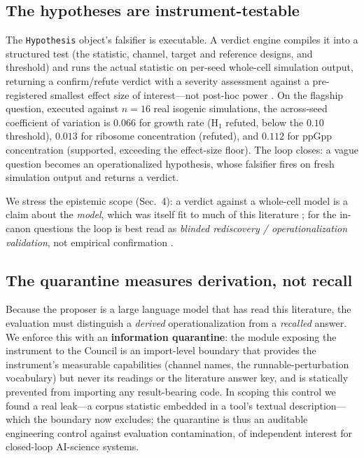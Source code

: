 \documentclass[11pt]{article}
\begin{document}
\subsection{The hypotheses are instrument-testable}
The \texttt{Hypothesis} object's falsifier is executable. A verdict engine compiles it into a structured test
(the statistic, channel, target and reference designs, and threshold) and runs the actual statistic on per-seed
whole-cell simulation output, returning a confirm/refute verdict with a severity assessment against a
pre-registered smallest effect size of interest---not post-hoc power \citep{mayo2018severe}. On the flagship
question, executed against $n=16$ real isogenic simulations, the across-seed coefficient of variation is $0.066$
for growth rate (H$_1$ refuted, below the $0.10$ threshold), $0.013$ for ribosome concentration (refuted), and
$0.112$ for ppGpp concentration (supported, exceeding the effect-size floor). The loop closes: a vague question
becomes an operationalized hypothesis, whose falsifier fires on fresh simulation output and returns a verdict.

We stress the epistemic scope (Sec.~4): a verdict against a whole-cell model is a claim about the \emph{model},
which was itself fit to much of this literature \citep{macklin2020ecoli,oreskes1994verification}; for the
in-canon questions the loop is best read as \emph{blinded rediscovery / operationalization validation}, not
empirical confirmation \citep{winsberg2010simulation}.

\subsection{The quarantine measures derivation, not recall}
Because the proposer is a large language model that has read this literature, the evaluation must distinguish a
\emph{derived} operationalization from a \emph{recalled} answer. We enforce this with an \textbf{information
quarantine}: the module exposing the instrument to the Council is an import-level boundary that provides the
instrument's measurable capabilities (channel names, the runnable-perturbation vocabulary) but never its
readings or the literature answer key, and is statically prevented from importing any result-bearing code. In
scoping this control we found a real leak---a corpus statistic embedded in a tool's textual description---which
the boundary now excludes; the quarantine is thus an auditable engineering control against evaluation
contamination, of independent interest for closed-loop AI-science systems.
\end{document}
